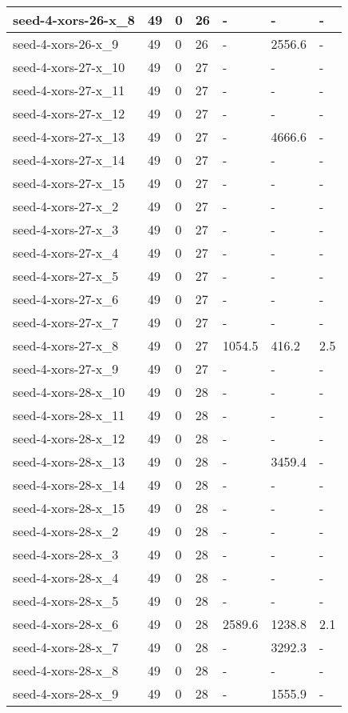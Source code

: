 \begin{scriptsize}
\begin{longtable}{|p{5cm}|l|l|l|l|l|l|}
seed-4-xors-26-x\_8&49&0&26&-&-&- \\ \hline 
seed-4-xors-26-x\_9&49&0&26&-&2556.6&- \\ \hline 
seed-4-xors-27-x\_10&49&0&27&-&-&- \\ \hline 
seed-4-xors-27-x\_11&49&0&27&-&-&- \\ \hline 
seed-4-xors-27-x\_12&49&0&27&-&-&- \\ \hline 
seed-4-xors-27-x\_13&49&0&27&-&4666.6&- \\ \hline 
seed-4-xors-27-x\_14&49&0&27&-&-&- \\ \hline 
seed-4-xors-27-x\_15&49&0&27&-&-&- \\ \hline 
seed-4-xors-27-x\_2&49&0&27&-&-&- \\ \hline 
seed-4-xors-27-x\_3&49&0&27&-&-&- \\ \hline 
seed-4-xors-27-x\_4&49&0&27&-&-&- \\ \hline 
seed-4-xors-27-x\_5&49&0&27&-&-&- \\ \hline 
seed-4-xors-27-x\_6&49&0&27&-&-&- \\ \hline 
seed-4-xors-27-x\_7&49&0&27&-&-&- \\ \hline 
seed-4-xors-27-x\_8&49&0&27&1054.5&416.2&2.5 \\ \hline 
seed-4-xors-27-x\_9&49&0&27&-&-&- \\ \hline 
seed-4-xors-28-x\_10&49&0&28&-&-&- \\ \hline 
seed-4-xors-28-x\_11&49&0&28&-&-&- \\ \hline 
seed-4-xors-28-x\_12&49&0&28&-&-&- \\ \hline 
seed-4-xors-28-x\_13&49&0&28&-&3459.4&- \\ \hline 
seed-4-xors-28-x\_14&49&0&28&-&-&- \\ \hline 
seed-4-xors-28-x\_15&49&0&28&-&-&- \\ \hline 
seed-4-xors-28-x\_2&49&0&28&-&-&- \\ \hline 
seed-4-xors-28-x\_3&49&0&28&-&-&- \\ \hline 
seed-4-xors-28-x\_4&49&0&28&-&-&- \\ \hline 
seed-4-xors-28-x\_5&49&0&28&-&-&- \\ \hline 
seed-4-xors-28-x\_6&49&0&28&2589.6&1238.8&2.1 \\ \hline 
seed-4-xors-28-x\_7&49&0&28&-&3292.3&- \\ \hline 
seed-4-xors-28-x\_8&49&0&28&-&-&- \\ \hline 
seed-4-xors-28-x\_9&49&0&28&-&1555.9&- \\ \hline 

\end{longtable}
\end{scriptsize}
